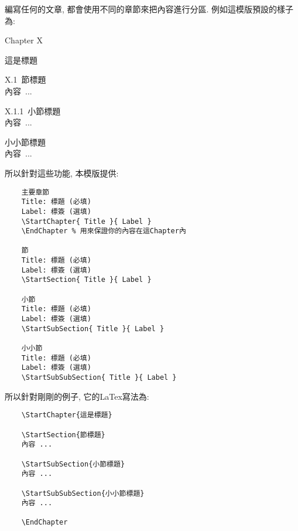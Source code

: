 
編寫任何的文章, 都會使用不同的章節來把內容進行分區. 例如這模版預設的樣子為:
\begin{DescriptionFrame}
  \vspace{0.2cm}
  \centerline{\LARGE Chapter X}
  \vspace{0.3cm}
  \centerline{\LARGE 這是標題}

  \vspace{0.5cm}
  \mbox{\Large X.1 節標題}\\
  \mbox{\hspace{1.2cm}內容 ...}

  \vspace{0.3cm}
  \mbox{\large X.1.1 小節標題}\\
  \mbox{\hspace{1.2cm}內容 ...}

  \vspace{0.3cm}
  \mbox{\large 小小節標題}\\
  \mbox{\hspace{1.2cm}內容 ...}
\end{DescriptionFrame}

所以針對這些功能, 本模版提供:
\begin{DescriptionFrame}
  \begin{verbatim}
    主要章節
    Title: 標題 (必填)
    Label: 標簽 (選填)
    \StartChapter{ Title }{ Label }
    \EndChapter % 用來保證你的內容在這Chapter內

    節
    Title: 標題 (必填)
    Label: 標簽 (選填)
    \StartSection{ Title }{ Label }

    小節
    Title: 標題 (必填)
    Label: 標簽 (選填)
    \StartSubSection{ Title }{ Label }

    小小節
    Title: 標題 (必填)
    Label: 標簽 (選填)
    \StartSubSubSection{ Title }{ Label }
  \end{verbatim}
\end{DescriptionFrame}

所以針對剛剛的例子, 它的LaTex寫法為:\\

\begin{DescriptionFrame}
  \begin{verbatim}
    \StartChapter{這是標題}

    \StartSection{節標題}
    內容 ...

    \StartSubSection{小節標題}
    內容 ...

    \StartSubSubSection{小小節標題}
    內容 ...

    \EndChapter
  \end{verbatim}
\end{DescriptionFrame}

